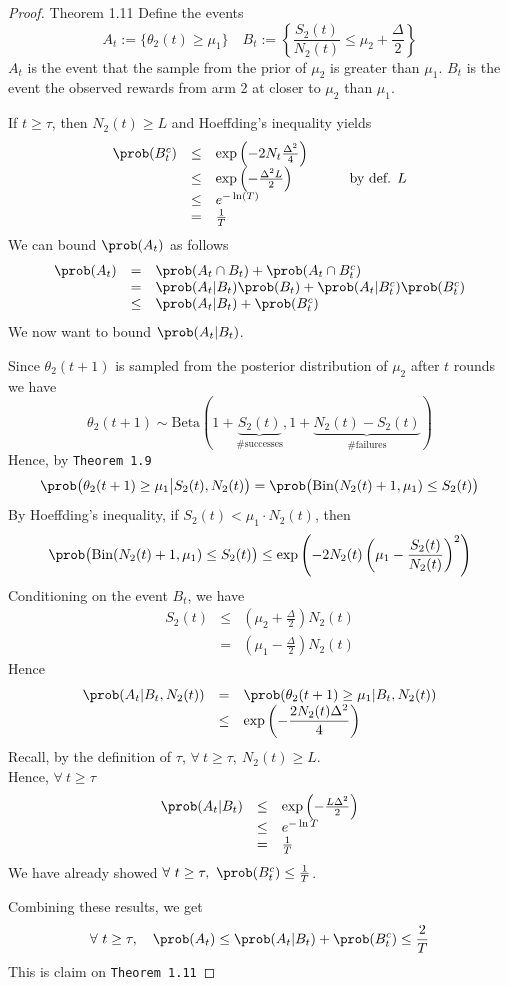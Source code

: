 \documentclass[11pt,a4paper]{article}
\begin{document}
\begin{proof}{Theorem 1.11}
  Define the events
  \[ A_t:=\{\theta_2(t)\geq\mu_1\}\quad B_t:=\left\{\dfrac{S_2(t)}{N_2(t)}\leq\mu_2+\frac\Delta2\right\} \]
  $A_t$ is the event that the sample from the prior of $\mu_2$ is greater than $\mu_1$. $B_t$ is the event the observed rewards from arm 2 at closer to $\mu_2$ than $\mu_1$.
  \par If $t\geq\tau$, then $N_2(t)\geq L$ and Hoeffding's inequality yields
  \[\begin{array}{rclll}
    \prob(B_t^c)&\leq&\exp\left(-2N_t\frac{\Delta^2}4\right)&\quad&\\
    &\leq&\exp\left(-\frac{\Delta^2L}2\right)&&\text{by def. }L\\
    &\leq&e^{-\ln(T)}\\
    &=&\frac1T
  \end{array}\]
  We can bound $\prob(A_t)$ as follows
  \[\begin{array}{rcl}
    \prob(A_t)&=&\prob(A_t\cap B_t)+\prob(A_t\cap B_t^c)\\
    &=&\prob(A_t|B_t)\prob(B_t)+\prob(A_t|B_t^c)\prob(B_t^c)\\
    &\leq&\prob(A_t|B_t)+\prob(B_t^c)
  \end{array}\]
  We now want to bound $\prob(A_t|B_t)$.
  \par Since $\theta_2(t+1)$ is sampled from the posterior distribution of $\mu_2$ after $t$ rounds we have
  \[ \theta_2(t+1)\sim\text{Beta}\left(1+\underbrace{S_2(t)}_\text{\# successes},1+\underbrace{N_2(t)-S_2(t)}_\text{\# failures}\right) \]
  Hence, by \texttt{Theorem 1.9}
  \[ \prob\big(\theta_2(t+1)\geq\mu_1\big|S_2(t),N_2(t)\big)=\prob\big(\text{Bin}(N_2(t)+1,\mu_1)\leq S_2(t)\big) \]
  By Hoeffding's inequality, if $S_2(t)<\mu_1\cdot N_2(t)$, then
  \[ \prob\big(\text{Bin}(N_2(t)+1,\mu_1)\leq S_2(t)\big)\leq\exp\left(-2N_2(t)\left(\mu_1-\frac{S_2(t)}{N_2(t)}\right)^2\right) \]
  Conditioning on the event $B_t$, we have
  \[\begin{array}{rcl}
    S_2(t)&\leq&\left(\mu_2+\frac\Delta2\right)N_2(t)\\
    &=&\left(\mu_1-\frac\Delta2\right)N_2(t)
  \end{array}\]
  Hence
  \[\begin{array}{rcl}
    \prob(A_t|B_t,N_2(t))&=&\prob(\theta_2(t+1)\geq\mu_1|B_t,N_2(t))\\
    &\leq&\exp\left(-\dfrac{2N_2(t)\Delta^2}4\right)
  \end{array}\]
  Recall, by the definition of $\tau$, $\forall\ t\geq\tau,\ N_2(t)\geq L$.\\
  Hence, $\forall\ t\geq\tau$
  \[\begin{array}{rcl}
    \prob(A_t|B_t)&\leq&\exp\left(-\frac{L\Delta^2}2\right)\\
    &\leq&e^{-\ln T}\\
    &=&\frac1T
  \end{array}\]
  We have already showed $\forall\ t\geq\tau,\ \prob(B_t^c)\leq\frac1T$.
  \par Combining these results, we get
  \[ \forall\ t\geq\tau,\quad\prob(A_t)\leq\prob(A_t|B_t)+\prob(B_t^c)\leq\frac2T \]
  This is claim on \texttt{Theorem 1.11} \proved
\end{proof}
\end{document}
